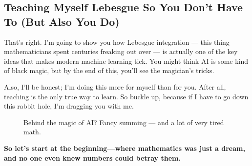 \subsection{Teaching Myself Lebesgue So You Don’t Have To (But Also You Do)}

That’s right. I’m going to show you how Lebesgue integration --- this thing mathematicians spent centuries freaking out over --- is actually one of the key ideas that makes modern machine learning tick. You might think AI is some kind of black magic, but by the end of this, you’ll see the magician’s tricks. 

Also, I'll be honest; I’m doing this more for myself than for you. After all, teaching is the only true way to learn. So buckle up, because if I have to go down this rabbit hole, I’m dragging you with me.  

\begin{figure}[H]
\centering
{}
\caption{Behind the magic of AI? Fancy summing — and a lot of very tired math.}
\end{figure}


\textbf{So let’s start at the beginning—where mathematics was just a dream, and no one even knew numbers could betray them.}
